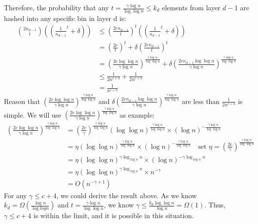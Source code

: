\documentclass[a4paper, english]{paper}
\begin{document}
 Therefore, the probability that any $t = \frac{\gamma\log n}{\log \log n}\le k_d$ elements from layer $d-1$ are hashed into any specific bin in layer d is:
\begin{align*}
{2n_{d-1}\choose t} \left((\frac1{n_{d-1}}^t+\delta)\right)&\le (\frac{2en_{d-1}}{t})^t\left((\frac1{n_{d-1}}^t+\delta)\right)\\
& = (\frac{2e}t)^t+\delta\left( \frac{2en_{d-1}}{t}\right)^t\\
& = (\frac{2e\log\log n}{\gamma\log n})^{\frac{\gamma\log n}{\log \log n}}+\delta\left( \frac{2en_{d-1}\log\log n}{\gamma\log n}\right)^{\frac{\gamma\log n}{\log \log n}}\\
& \le \frac1{2n^{c+3}}+\frac1{2n^{c+3}}\\
& = \frac1{n^{c+3}}
\end{align*}
\quad Reason that $(\frac{2e\log\log n}{\gamma\log n})^{\frac{\gamma\log n}{\log \log n}}$ and $\delta\left( \frac{2en_{d-1}\log\log n}{\gamma\log n}\right)^{\frac{\gamma\log n}{\log \log n}}$ are less than $\frac1{2n^{c+3}}$ is simple. We will use $(\frac{2e\log\log n}{\gamma\log n})^{\frac{\gamma\log n}{\log \log n}}$ as example:
\begin{align*}
(\frac{2e\log\log n}{\gamma\log n})^{\frac{\gamma\log n}{\log \log n}} &= (\frac{2e}{\gamma})^{\frac{\gamma\log n}{\log \log n}}(\log\log n)^{\frac{\gamma\log n}{\log \log n}}\times(\log n)^{-\frac{\gamma\log n}{\log \log n}}\\
&= \eta(\log\log n)^{\frac{\gamma\log n}{\log \log n}}\times(\log n)^{-\frac{\gamma\log n}{\log \log n}}\quad\text{set }\eta=(\frac{2e}{\gamma})^{\frac{\gamma\log n}{\log \log n}}\\
&=\eta (\log\log n)^{\gamma\log_{\log n} n}\times(\log n)^{-\gamma\log_{\log n} n}\\
&= \eta (\log\log n)^{\gamma\log_{\log n} n}\times n^{-\gamma}\\
&= O(n^{-\gamma+1})
\end{align*}
\quad For any $\gamma\le c+4$, we could derive the result above. As we know $k_d = \Omega(\frac{\log n}{\log log n})$ and $t = \frac{\gamma\log n}{\log\log n}$, we know $\gamma\le \frac{k_d\log\log n}{\log n} = \Omega(1)$. Thus, $\gamma\le c+4$ is within the limit, and it is possible in this situation.\\
\end{document}
